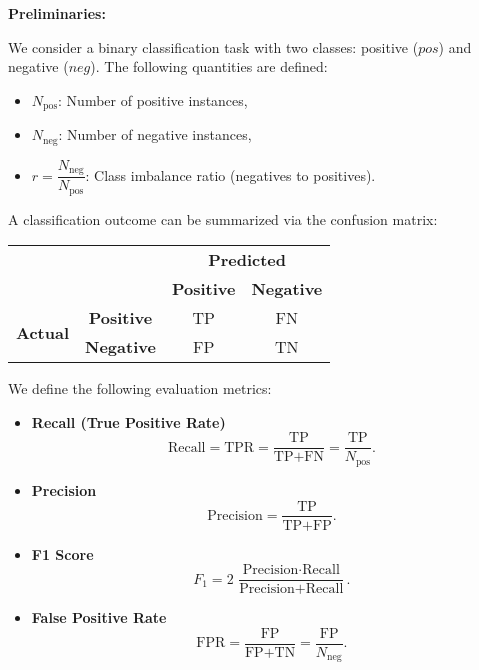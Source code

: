 
\small

\textbf{Preliminaries:}

\noindent
We consider a binary classification task with two classes: positive (\(\textit{pos}\)) and negative (\(\textit{neg}\)). The following quantities are defined:

\begin{itemize}
    \item \(N_{\text{pos}}\): Number of positive instances,
    \item \(N_{\text{neg}}\): Number of negative instances,
    \item \(r = \dfrac{N_{\text{neg}}}{N_{\text{pos}}}\): Class imbalance ratio (negatives to positives).
\end{itemize}

\noindent A classification outcome can be summarized via the confusion matrix:

\begin{table}[!ht]
    \centering
    \renewcommand{\arraystretch}{1.2}
    \begin{tabular}{c|c|c|c|}
    \multicolumn{2}{c}{} & \multicolumn{2}{c}{\textbf{Predicted}} \\
    \cline{3-4}
    \multicolumn{2}{c|}{} 
       & \cellcolor{green!25}\textbf{Positive} 
       & \cellcolor{red!25}\textbf{Negative} \\
    \cline{2-4}
    \multirow{2}{*}{\textbf{Actual}} 
       & \cellcolor{green!25}\textbf{Positive} & TP & FN \\ 
    \cline{2-4}
       & \cellcolor{red!25}\textbf{Negative} & FP & TN \\ 
    \cline{2-4}
    \end{tabular}
\end{table}

We define the following evaluation metrics:
\begin{itemize}
    \item \textbf{Recall (True Positive Rate)} 
        \[
            \text{Recall} = \text{TPR} = \frac{\text{TP}}{\text{TP} + \text{FN}} 
            = \frac{\text{TP}}{N_{\text{pos}}}.
        \]
    \item \textbf{Precision} 
        \[
            \text{Precision} = \frac{\text{TP}}{\text{TP} + \text{FP}}.
        \]
    \item \textbf{F1 Score} 
        \[
            F_1 = 2 \,\frac{\text{Precision} \cdot \text{Recall}}{\text{Precision} + \text{Recall}}.
        \]
    \item \textbf{False Positive Rate}
        \[
            \text{FPR} = \frac{\text{FP}}{\text{FP} + \text{TN}} 
            = \frac{\text{FP}}{N_{\text{neg}}}.
        \]
\end{itemize}

